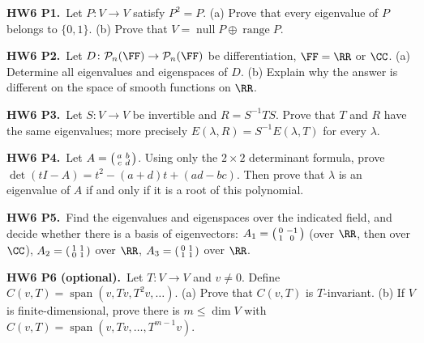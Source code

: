 \documentclass[10pt]{scrartcl}
\DeclareMathOperator{\spn}{span}\DeclareMathOperator{\nul}{null}\DeclareMathOperator{\range}{range}
\newcommand{\PP}{\mathcal P}\newcommand{\LL}{\mathcal L}\newcommand{\MM}{\mathcal M}\newcommand{\T}{\mathsf T}
\begin{document}
\begin{prob}\textbf{HW6 P1.}\ Let $P\colon V\to V$ satisfy $P^2=P$. (a) Prove that every eigenvalue of $P$ belongs to $\{0,1\}$. (b) Prove that $V=\nul P\oplus\range P$.


\end{prob}
\begin{prob}\textbf{HW6 P2.}\ Let $D\colon\PP_n(\FF)\to\PP_n(\FF)$ be differentiation, $\FF=\RR$ or $\CC$. (a) Determine all eigenvalues and eigenspaces of $D$. (b) Explain why the answer is different on the space of smooth functions on $\RR$.


\end{prob}
\begin{prob}\textbf{HW6 P3.}\ Let $S\colon V\to V$ be invertible and $R=S^{-1}TS$. Prove that $T$ and $R$ have the same eigenvalues; more precisely $E(\lambda,R)=S^{-1}E(\lambda,T)$ for every $\lambda$.


\end{prob}
\begin{prob}\textbf{HW6 P4.}\ Let $A=\begin{psmallmatrix}a&b\\c&d\end{psmallmatrix}$. Using only the $2\times2$ determinant formula, prove $\det(tI-A)=t^2-(a+d)t+(ad-bc)$. Then prove that $\lambda$ is an eigenvalue of $A$ if and only if it is a root of this polynomial.
\end{prob}
\begin{prob}\textbf{HW6 P5.}\ Find the eigenvalues and eigenspaces over the indicated field, and decide whether there is a basis of eigenvectors: $A_1=\begin{psmallmatrix}0&-1\\1&0\end{psmallmatrix}$ (over $\RR$, then over $\CC$), $A_2=\begin{psmallmatrix}1&1\\0&1\end{psmallmatrix}$ over $\RR$, $A_3=\begin{psmallmatrix}0&1\\1&1\end{psmallmatrix}$ over $\RR$.
\end{prob}
\begin{prob}\textbf{HW6 P6 (optional).}\ Let $T\colon V\to V$ and $v\ne0$. Define $C(v,T)=\spn(v,Tv,T^2v,\dots)$. (a) Prove that $C(v,T)$ is $T$-invariant. (b) If $V$ is finite-dimensional, prove there is $m\le\dim V$ with $C(v,T)=\spn(v,Tv,\dots,T^{m-1}v)$.


\end{prob}
\end{document}
